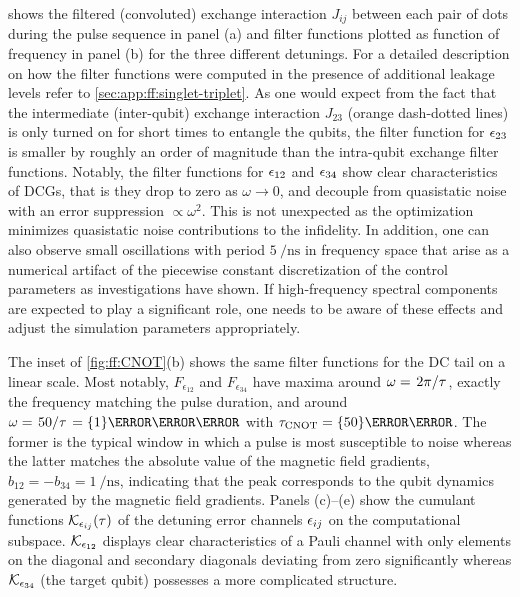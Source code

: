  shows the filtered (convoluted) exchange interaction $J_{ij}$ between each pair of dots during the pulse sequence in panel (a) and filter functions plotted as function of frequency in panel (b) for the three different detunings.
For a detailed description on how the filter functions were computed in the presence of additional leakage levels refer to \cref{sec:app:ff:singlet-triplet}.
As one would expect from the fact that the intermediate (inter-qubit) exchange interaction $J_{23}$ (orange dash-dotted lines) is only turned on for short times to entangle the qubits, the filter function for $\epsilon_{23}$ is smaller by roughly an order of magnitude than the intra-qubit exchange filter functions.
Notably, the filter functions for $\epsilon_{12}$ and $\epsilon_{34}$ show clear characteristics of DCGs, that is they drop to zero as $\omega\rightarrow 0$, and decouple from quasistatic noise with an error suppression $\propto\omega^2$.
This is not unexpected as the optimization minimizes quasistatic noise contributions to the infidelity.
In addition, one can also observe small oscillations with period $\qty{5}{\per\nano\second}$ in frequency space that arise as a numerical artifact of the piecewise constant discretization of the control parameters as investigations have shown.
If high-frequency spectral components are expected to play a significant role, one needs to be aware of these effects and adjust the simulation parameters appropriately.

The inset of \cref{fig:ff:CNOT}(b) shows the same filter functions for the DC tail on a linear scale.
Most notably, $F_{\epsilon_{12}}$ and $F_{\epsilon_{34}}$ have maxima around $\omega = \flatfrac{2\pi}{\tau}$, \ie exactly the frequency matching the pulse duration, and around $\omega = \flatfrac{50}{\tau} = \qty{1}{\per\nano\second}$ with $\tau_\mr{CNOT} = \qty{50}{\nano\second}$.
The former is the typical window in which a pulse is most susceptible to noise whereas the latter matches the absolute value of the magnetic field gradients, $b_{12} = -b_{34} = \qty{1}{\per\nano\second}$, indicating that the peak corresponds to the qubit dynamics generated by the magnetic field gradients.
Panels (c)--(e) show the cumulant functions $\mathcal{K}_{\epsilon_{ij}}(\tau)$ of the detuning error channels $\epsilon_{ij}$ on the computational subspace.
$\mathcal{K}_{\epsilon_{12}}$ displays clear characteristics of a Pauli channel with only elements on the diagonal and secondary diagonals deviating from zero significantly whereas $\mathcal{K}_{\epsilon_{34}}$ (the target qubit) possesses a more complicated structure.


